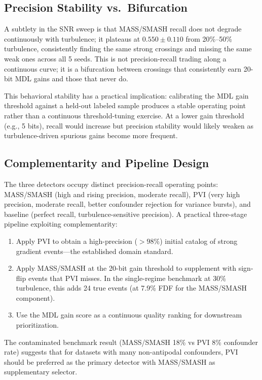 \documentclass[12pt,letterpaper]{article}
\begin{document}
\subsection{Precision Stability vs.\ Bifurcation}

A subtlety in the SNR sweep is that MASS/SMASH recall does not degrade
continuously with turbulence; it plateaus at $0.550\pm0.110$ from
20\%--50\% turbulence, consistently finding the same strong crossings and
missing the same weak ones across all 5 seeds.
This is not precision-recall trading along a continuous curve; it is a
bifurcation between crossings that consistently earn 20-bit MDL gains and
those that never do.

This behavioral stability has a practical implication: calibrating the MDL
gain threshold against a held-out labeled sample produces a stable operating
point rather than a continuous threshold-tuning exercise.
At a lower gain threshold (e.g., 5 bits), recall would increase but precision
stability would likely weaken as turbulence-driven spurious gains become more
frequent.

\subsection{Complementarity and Pipeline Design}

The three detectors occupy distinct precision-recall operating points:
MASS/SMASH (high and rising precision, moderate recall), PVI (very high
precision, moderate recall, better confounder rejection for variance bursts),
and baseline (perfect recall, turbulence-sensitive precision).
A practical three-stage pipeline exploiting complementarity:

\begin{enumerate}
  \item Apply PVI to obtain a high-precision ($> 98\%$) initial catalog of
    strong gradient events---the established domain standard.
  \item Apply MASS/SMASH at the 20-bit gain threshold to supplement with
    sign-flip events that PVI misses.
    In the single-regime benchmark at 30\% turbulence, this adds 24 true
    events (at 7.9\% FDF for the MASS/SMASH component).
  \item Use the MDL gain score as a continuous quality ranking for downstream
    prioritization.
\end{enumerate}

The contaminated benchmark result (MASS/SMASH 18\% vs PVI 8\% confounder rate)
suggests that for datasets with many non-antipodal confounders, PVI should be
preferred as the primary detector with MASS/SMASH as supplementary selector.
\end{document}
